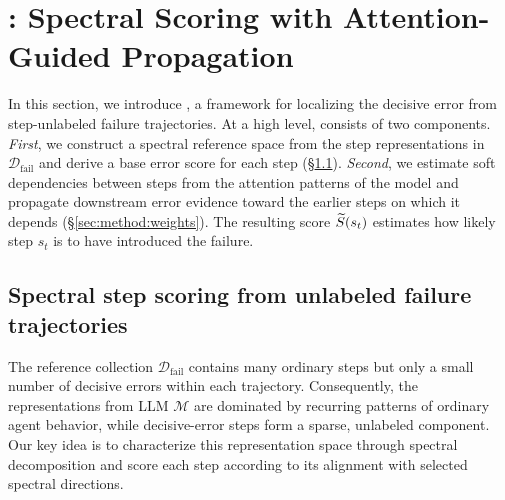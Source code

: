 \section{\soap: Spectral Scoring with Attention-Guided Propagation}
\label{sec:method}


In this section, we introduce \soap, a framework for localizing the
decisive error from step-unlabeled failure trajectories.
At a high level, \soap consists of two components.
\textit{First}, we construct a spectral reference space from the step representations
in $\mathcal{D}_{\mathrm{fail}}$ and derive a base error score for each step
(\S\ref{sec:method:base}).
\textit{Second}, we estimate soft dependencies between steps from the attention patterns
of the model and propagate downstream error evidence toward the
earlier steps on which it depends
(\S\ref{sec:method:weights}).
The resulting score $\widetilde{S}(s_t)$ estimates how likely step $s_t$ is to have
introduced the failure.

\subsection{Spectral step scoring from unlabeled failure trajectories}
\label{sec:method:base}

The reference collection $\mathcal{D}_{\mathrm{fail}}$ contains many ordinary
steps but only a small number of decisive errors within each trajectory.
Consequently, the representations from LLM $\mathcal{M}$ are dominated by recurring patterns
of ordinary agent behavior, while decisive-error steps form a sparse,
unlabeled component.
Our key idea is to characterize this representation space through spectral
decomposition and score each step according to its alignment with selected
spectral directions.


